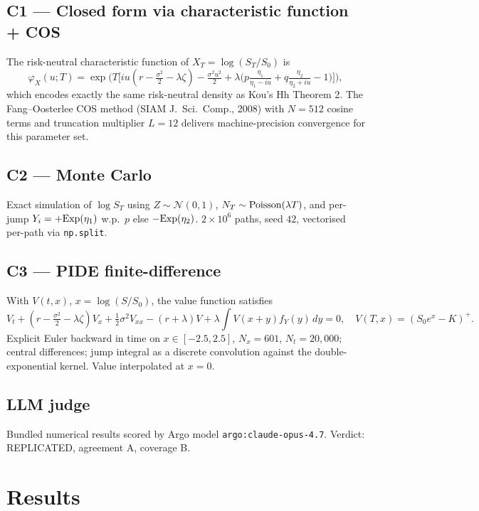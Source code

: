 \documentclass[11pt]{article}
\begin{document}
\subsection{C1 --- Closed form via characteristic function + COS}
The risk-neutral characteristic function of $X_T = \log(S_T/S_0)$ is
\[
\varphi_X(u;T) = \exp\!\Big(T\big[iu(r-\tfrac{\sigma^2}{2}-\lambda\zeta) - \tfrac{\sigma^2 u^2}{2} + \lambda\big(p\tfrac{\eta_1}{\eta_1 - iu} + q\tfrac{\eta_2}{\eta_2 + iu} - 1\big)\big]\Big),
\]
which encodes exactly the same risk-neutral density as Kou's Hh Theorem 2. The Fang--Oosterlee COS method (SIAM J.\ Sci.\ Comp., 2008) with $N=512$ cosine terms and truncation multiplier $L=12$ delivers machine-precision convergence for this parameter set.

\subsection{C2 --- Monte Carlo}
Exact simulation of $\log S_T$ using $Z \sim \mathcal{N}(0,1)$, $N_T \sim {\rm Poisson}(\lambda T)$, and per-jump $Y_i = +{\rm Exp}(\eta_1)$ w.p.\ $p$ else $-{\rm Exp}(\eta_2)$. $2\times 10^6$ paths, seed $42$, vectorised per-path via \texttt{np.split}.

\subsection{C3 --- PIDE finite-difference}
With $V(t,x)$, $x=\log(S/S_0)$, the value function satisfies
\[
V_t + (r-\tfrac{\sigma^2}{2}-\lambda\zeta) V_x + \tfrac{1}{2}\sigma^2 V_{xx} - (r+\lambda) V + \lambda \int V(x+y) f_Y(y)\, dy = 0,
\quad V(T,x) = (S_0 e^x - K)^+.
\]
Explicit Euler backward in time on $x\in[-2.5, 2.5]$, $N_x=601$, $N_t=20{,}000$; central differences; jump integral as a discrete convolution against the double-exponential kernel. Value interpolated at $x=0$.

\subsection{LLM judge}
Bundled numerical results scored by Argo model \texttt{argo:claude-opus-4.7}. Verdict: REPLICATED, agreement A, coverage B.

\section{Results}
\end{document}
